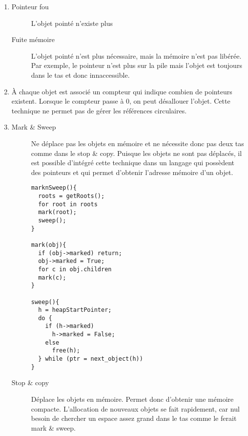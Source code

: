 \begin{Answer}
  \begin{enumerate}
  \item \begin{description}
    \item[Pointeur fou] L’objet pointé n’existe plus
    \item[Fuite mémoire] L’objet pointé n’est plus nécessaire, mais la
      mémoire n'est pas libérée. Par exemple, le pointeur n'est
      plus sur la pile mais l'objet est toujours dans le tas et donc
      innaccessible.
    \end{description}

  \item À chaque objet est associé un compteur qui indique combien de
    pointeurs existent. Lorsque le compteur passe à 0, on peut
    désallouer l’objet. Cette technique ne permet pas de gérer les
    références circulaires.

  \item \begin{description}
    \item[Mark \& Sweep] Ne déplace pas les objets en mémoire et ne
      nécessite donc pas deux tas comme dans le stop \& copy.  Puisque
      les objets ne sont pas déplacés, il est possible d'intégré cette
      technique dans un langage qui possèdent des pointeurs et qui
      permet d'obtenir l'adresse mémoire d'un objet.
      
      \begin{verbatim}
marknSweep(){
  roots = getRoots();
  for root in roots
  mark(root);
  sweep();
}

mark(obj){
  if (obj->marked) return;
  obj->marked = True;
  for c in obj.children
  mark(c);
}

sweep(){
  h = heapStartPointer;
  do {
    if (h->marked)
      h->marked = False;
    else
      free(h);
  } while (ptr = next_object(h))
}
      \end{verbatim}

      \item[Stop \& copy] Déplace les objets en mémoire. Permet donc
        d'obtenir une mémoire compacte. L'allocation de nouveaux
        objets se fait rapidement, car nul besoin de chercher un
        espace assez grand dans le tas comme le ferait mark \& sweep.
    \end{description}
    \end{enumerate}
\end{Answer}